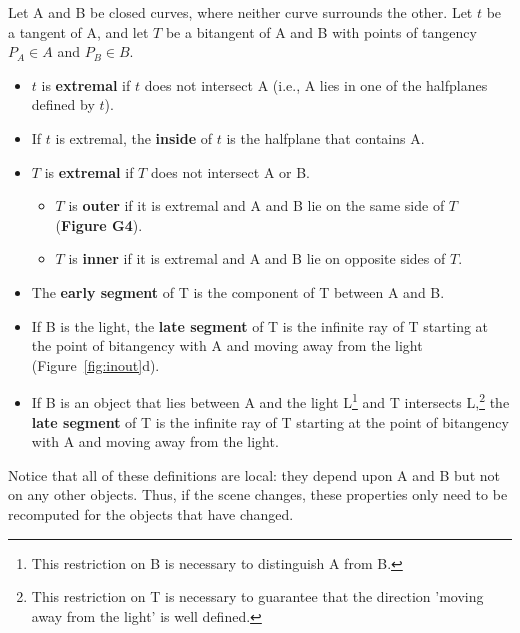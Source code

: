 \documentclass[9pt,twocolumn]{article}
\begin{document}
\begin{defn2}
\label{defn:outer}
Let A and B be closed curves, where neither curve surrounds the other.
Let $t$ be a tangent of A,
and let $T$ be a bitangent of A and B with points of tangency $P_A \in A$ and 
$P_B \in B$.

\begin{itemize}
\item $t$ is {\bf extremal} if $t$ does not intersect A
	(i.e., A lies in one of the halfplanes defined by $t$).
\item If $t$ is extremal, the {\bf inside} of $t$ is
	the halfplane that contains A.
\item $T$ is {\bf extremal} if $T$ does not intersect A or B.
\begin{itemize}
\item $T$ is {\bf outer} if it is extremal and 
A and B lie on the same side of $T$ ({\bf Figure G4}).
\item $T$ is {\bf inner} if it is extremal and
A and B lie on opposite sides of $T$.
\end{itemize}
\item
The {\bf early segment} of T is the component of T between A and B.
\item 
If B is the light,
the {\bf late segment} of T is the infinite ray of T starting at
the point of bitangency with A and moving away from the light 
(Figure~\ref{fig:inout}d).
\item
If B is an object that lies between A and the light L\footnote{This 
	restriction on B is necessary to distinguish A from B.}
and T intersects L,\footnote{This restriction on T is necessary
	to guarantee that the direction 'moving away from the light'
	is well defined.}
the {\bf late segment} of T is the infinite ray of T starting at the point
of bitangency with A and moving away from the light.
\end{itemize}
\end{defn2}

Notice that all of these definitions are local: they depend upon A and B
but not on any other objects.
Thus, if the scene changes, these properties only need to be recomputed
for the objects that have changed.
\end{document}

